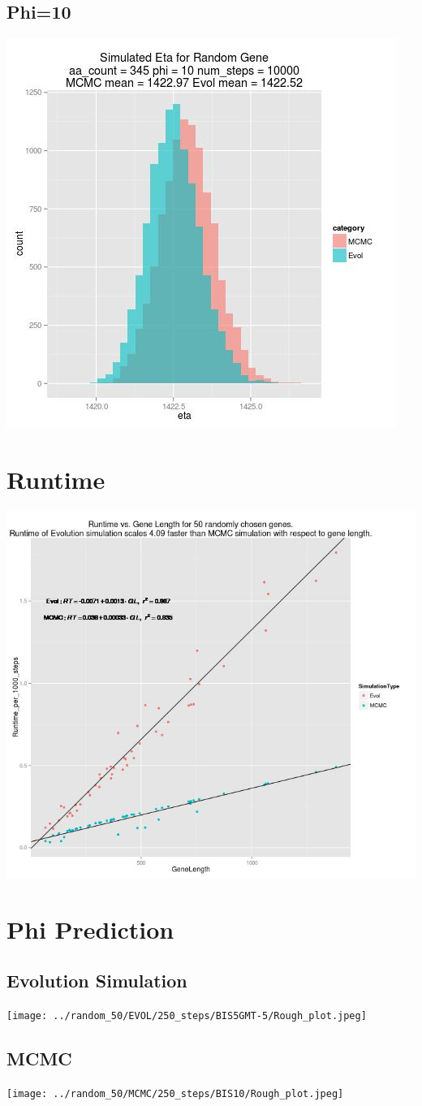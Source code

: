 \documentclass{article}
\begin{document}
\subsection{Phi=10}
\includegraphics[scale=0.5]{10_phi.jpg}

\section{Runtime}
\includegraphics[scale=0.5]{../runtime/Runtime_plot_random_50.jpg}
\section{Phi Prediction}
\subsection{Evolution Simulation}
\texttt{[image: ../random\_50/EVOL/250\_steps/BIS5GMT-5/Rough\_plot.jpeg]}
\subsection{MCMC}
\texttt{[image: ../random\_50/MCMC/250\_steps/BIS10/Rough\_plot.jpeg]}
\end{document}
